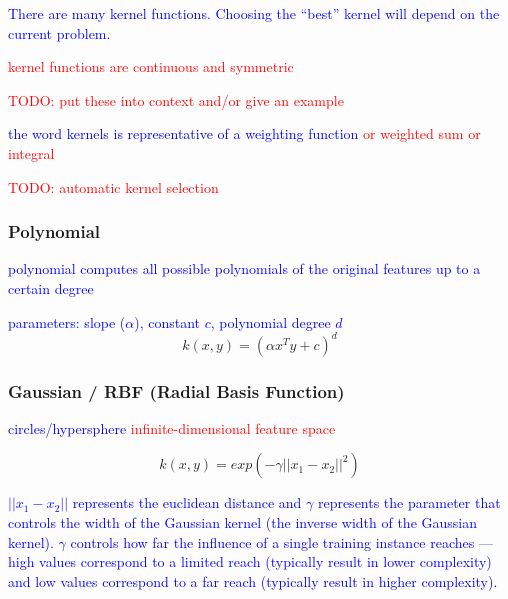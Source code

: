 \textcolor{blue}{There are many kernel functions. Choosing the ``best'' kernel will depend on the current problem.}

\textcolor{red}{kernel functions are continuous and symmetric}

\textcolor{red}{TODO: put these into context and/or give an example}

\textcolor{blue}{the word kernels is representative of a weighting function \textcolor{red}{or weighted sum or integral}}



\textcolor{red}{TODO: automatic kernel selection}

\subsubsection{Polynomial}

\textcolor{blue}{polynomial computes all possible polynomials of the original features up to a certain degree}

\textcolor{blue}{parameters: slope ($\alpha$), constant $c$, polynomial degree $d$}
\begin{equation}
{k(x, y) = (\alpha x^T y + c)^d}
\label{eq:kernel_polynomial_eq}
\end{equation}

\subsubsection{Gaussian / RBF (Radial Basis Function)}

\textcolor{blue}{circles/hypersphere}
\textcolor{red}{infinite-dimensional feature space}

\begin{equation}
{k(x, y) = exp(- \gamma || x_1 - x_2 || ^2 ) }
\label{eq:kernel_guassian_rbf_eq}
\end{equation}

\textcolor{blue}{$|| x_1 - x_2 ||$ represents the euclidean distance and $\gamma$ represents the parameter that controls the width of the Gaussian kernel (the inverse width of the Gaussian kernel). $\gamma$ controls how far the influence of a single training instance reaches --- high values correspond to a limited reach (typically result in lower complexity) and low values correspond to a far reach (typically result in higher complexity).}


